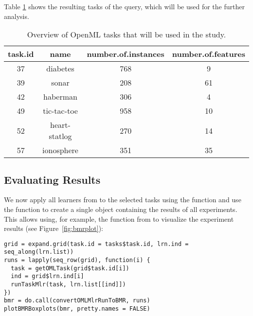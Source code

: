 Table \ref{tab:tasks} shows the resulting tasks of the query, which will be used for the further analysis.

\begin{table}[ht]
\centering
\begin{tabular}{cccc}
  \hline
task.id & name & number.of.instances & number.of.features \\ 
  \hline
 37 & diabetes & 768 &   9 \\ 
   39 & sonar & 208 &  61 \\ 
   42 & haberman & 306 &   4 \\ 
   49 & tic-tac-toe & 958 &  10 \\ 
   52 & heart-statlog & 270 &  14 \\ 
   57 & ionosphere & 351 &  35 \\ 
   \hline
\end{tabular}
\caption{Overview of OpenML tasks that will be used in the study.} 
\label{tab:tasks}
\end{table}


\subsection{Evaluating Results}
\label{sec:evaluation}
We now apply all learners from  to the selected tasks using the  function
and use the  function to create a single 
 object containing the results of all experiments.
This allows using, for example, the  function from 
 to visualize the experiment results (see Figure~\ref{fig:bmrplot}):



\begin{knitrout}\small
{}\color{fgcolor}\begin{kframe}
\begin{verbatim}
grid = expand.grid(task.id = tasks$task.id, lrn.ind = seq_along(lrn.list))
runs = lapply(seq_row(grid), function(i) {
  task = getOMLTask(grid$task.id[i])
  ind = grid$lrn.ind[i]
  runTaskMlr(task, lrn.list[[ind]])
})
bmr = do.call(convertOMLMlrRunToBMR, runs)
plotBMRBoxplots(bmr, pretty.names = FALSE)
\end{verbatim}
\end{kframe}
\end{knitrout}


